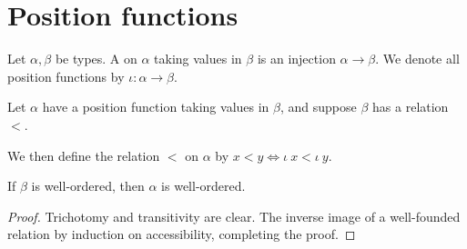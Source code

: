\section{Position functions}

\begin{definition}
    Let \( \alpha, \beta \) be types.
    A  on \( \alpha \) taking values in \( \beta \) is an injection \( \alpha \to \beta \).
    We denote all position functions by \( \iota : \alpha \to \beta \).
\end{definition}
Let \( \alpha \) have a position function taking values in \( \beta \), and suppose \( \beta \) has a relation \( < \).
\begin{definition}
    We then define the relation \( < \) on \( \alpha \) by \( x < y \Leftrightarrow \iota\ x < \iota\ y \).
\end{definition}
\begin{lemma}
    If \( \beta \) is well-ordered, then \( \alpha \) is well-ordered.
\end{lemma}
\begin{proof}
    Trichotomy and transitivity are clear.
    The inverse image of a well-founded relation  by induction on accessibility, completing the proof.
\end{proof}

